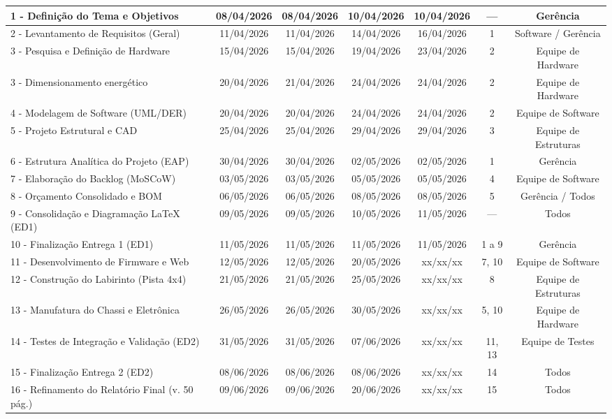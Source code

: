 \begin{landscape}
\begin{table}[htpb]
\begin{center}
{\begin{tabular}{|l|c|c|c|c|c|c|}
1 - Definição do Tema e Objetivos & 08/04/2026 & 08/04/2026 & 10/04/2026 & 10/04/2026 & --- & Gerência \\ \hline
2 - Levantamento de Requisitos (Geral) & 11/04/2026 & 11/04/2026 & 14/04/2026 & 16/04/2026 & 1 & Software / Gerência \\ \hline
3 - Pesquisa e Definição de Hardware & 15/04/2026 & 15/04/2026 & 19/04/2026 & 23/04/2026 & 2 & Equipe de Hardware \\ \hline
3 - Dimensionamento energético & 20/04/2026 & 21/04/2026 & 24/04/2026 & 24/04/2026 & 2 & Equipe de Hardware \\ \hline
4 - Modelagem de Software (UML/DER) & 20/04/2026 & 20/04/2026 & 24/04/2026 & 24/04/2026 & 2 & Equipe de Software \\ \hline
5 - Projeto Estrutural e CAD & 25/04/2026 & 25/04/2026 & 29/04/2026 & 29/04/2026 & 3 & Equipe de Estruturas \\ \hline
6 - Estrutura Analítica do Projeto (EAP) & 30/04/2026 & 30/04/2026 & 02/05/2026 & 02/05/2026 & 1 & Gerência \\ \hline
7 - Elaboração do Backlog (MoSCoW) & 03/05/2026 & 03/05/2026 & 05/05/2026 & 05/05/2026 & 4 & Equipe de Software \\ \hline
8 - Orçamento Consolidado e BOM & 06/05/2026 & 06/05/2026 & 08/05/2026 & 08/05/2026 & 5 & Gerência / Todos \\ \hline
9 - Consolidação e Diagramação LaTeX (ED1) & 09/05/2026 & 09/05/2026 & 10/05/2026 & 11/05/2026 & --- & Todos \\ \hline
10 - Finalização Entrega 1 (ED1) & 11/05/2026 & 11/05/2026 & 11/05/2026 & 11/05/2026 & 1 a 9 & Gerência \\ \hline
11 - Desenvolvimento de Firmware e Web & 12/05/2026 & 12/05/2026 & 20/05/2026 & xx/xx/xx & 7, 10 & Equipe de Software \\ \hline
12 - Construção do Labirinto (Pista 4x4) & 21/05/2026 & 21/05/2026 & 25/05/2026 & xx/xx/xx & 8 & Equipe de Estruturas \\ \hline
13 - Manufatura do Chassi e Eletrônica & 26/05/2026 & 26/05/2026 & 30/05/2026 & xx/xx/xx & 5, 10 & Equipe de Hardware \\ \hline
14 - Testes de Integração e Validação (ED2) & 31/05/2026 & 31/05/2026 & 07/06/2026 & xx/xx/xx & 11, 13 & Equipe de Testes \\ \hline
15 - Finalização Entrega 2 (ED2) & 08/06/2026 & 08/06/2026 & 08/06/2026 & xx/xx/xx & 14 & Todos \\ \hline
16 - Refinamento do Relatório Final (v. 50 pág.) & 09/06/2026 & 09/06/2026 & 20/06/2026 & xx/xx/xx & 15 & Todos \\ \hline

\end{tabular}}
\end{center}
\end{table}
\end{landscape}
